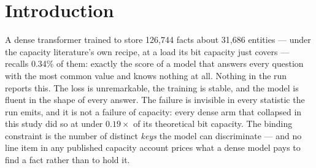 %

\section{Introduction}

A dense transformer trained to store 126,744 facts about 31,686 entities --- under the capacity literature's own recipe, at a load its bit capacity just covers --- recalls 0.34\% of them: exactly the score of a model that answers every question with the most common value and knows nothing at all. %
Nothing in the run reports this. The loss is unremarkable, the training is stable, and the model is fluent in the shape of every answer. The failure is invisible in every statistic the run emits, and it is not a failure of capacity: every dense arm that collapsed in this study did so at under $0.19\times$ of its theoretical bit capacity. %
The binding constraint is the number of distinct \emph{keys} the model can discriminate --- and no line item in any published capacity account prices what a dense model pays to find a fact rather than to hold it.


